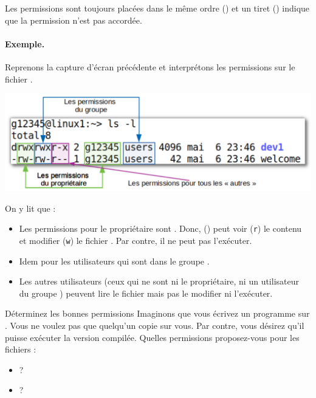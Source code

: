 \documentclass[a4paper,11pt]{style-esi/td}
\begin{document}
		Les permissions sont toujours placées dans le même ordre ()
		et un tiret (\samp{-}) indique que la permission n'est pas accordée.

		\paragraph{Exemple.}
		Reprenons la capture d'écran précédente et interprétons
		les permissions sur le fichier .
		\begin{center}
			\includegraphics[width=.8\textwidth]{image/categorie}
		\end{center}
		On y lit que :
		\begin{itemize}
		\item
			Les permissions pour le propriétaire sont .
			Donc, () 
			peut voir (\texttt{r}) le contenu 
			et modifier (\texttt{w}) le fichier .
			Par contre, il ne peut pas l'exécuter.
		\item 
			Idem pour les utilisateurs qui sont dans le groupe .
		\item 
			Les autres utilisateurs 
			(ceux qui ne sont ni le propriétaire, ni un utilisateur du groupe )
			peuvent lire le fichier mais pas le modifier ni l'exécuter.
		\end{itemize}

		\medskip
		\begin{Exercice}{Déterminez les bonnes permissions}
			Imaginons que vous écrivez un programme  sur .
			Vous ne voulez pas que quelqu'un copie sur vous.
			Par contre, vous désirez qu'il puisse exécuter la version 
			com\-pi\-lée.
			Quelles permissions proposez-vous pour les fichiers :
			\begin{itemize}
			\item {} ? 
				{\tiny
					\textfield{-}\quad
					\textfield{-}\textfield{-}\textfield{-}\quad
					\textfield{-}\textfield{-}\textfield{-}
				}
			\item \samp{.class} ? 
				{\tiny
					\textfield{-}\textfield{-}\quad
					\textfield{-}\textfield{-}\quad
					\textfield{-}\textfield{-}
				}
			\end{itemize}
		\end{Exercice}
\end{document}
